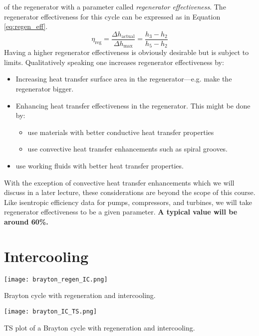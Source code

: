  of the regenerator with a parameter called \emph{regenerator effectiveness}.  The regenerator effectiveness for this cycle can be expressed as in Equation \ref{eq:regen_eff}.
\begin{equation}
\eta_{\text{reg}} = \frac{\Delta h_{\text{actual}}}{\Delta h_{\text{max}}} = \frac{h_3 - h_2}{h_5 - h_2}
\label{eq:regen_eff}
\end{equation}
Having a higher regenerator effectiveness is obviously desirable but is subject to limits.  Qualitatively speaking one increases regenerator effectiveness by:
\begin{itemize}
\item Increasing heat transfer surface area in the regenerator---e.g. make the regenerator bigger.
\item Enhancing heat transfer effectiveness in the regenerator. This might be done by:
\begin{itemize}
\item use materials with better conductive heat transfer properties
\item use convective heat transfer enhancements such as spiral grooves.  
\end{itemize}
\item use working fluids with better heat transfer properties.
\end{itemize}
With the exception of convective heat transfer enhancements which we will discuss in a later lecture, these considerations are beyond the scope of this course. Like isentropic efficiency data for pumps, compressors, and turbines, we will take regenerator effectiveness to be a given parameter.  \textbf{A typical value will be around 60\%.}

\section{Intercooling} 
\begin{marginfigure}
\texttt{[image: brayton\_regen\_IC.png]}
\caption{Brayton cycle with regeneration and intercooling.}
\label{fig:brayton_regen_IC}
\end{marginfigure}

\begin{marginfigure}
\texttt{[image: brayton\_IC\_TS.png]}
\caption{TS plot of a Brayton cycle with regeneration and intercooling.}
\label{fig:brayton_IC_TS}
\end{marginfigure}

